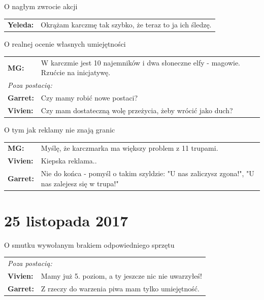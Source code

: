 \documentclass[10pt,twoside,twocolumn]{book}
\begin{document}
\begin{rpg-quotebox}{O nagłym zwrocie akcji}
   \begin{tabularx}{\columnwidth}{lX}
      \textbf{Yeleda:} & Okrążam karczmę tak szybko, że teraz to ja ich śledzę.\\
   \end{tabularx}
\end{rpg-quotebox}

\begin{rpg-quotebox}{O realnej ocenie własnych umiejętności}
   \begin{tabularx}{\columnwidth}{lX}
      \textbf{MG:} & W karczmie jest 10 najemników i dwa słoneczne elfy - magowie. Rzućcie na inicjatywę.\\
      \multicolumn{2}{l}{\textit{Poza postacią:}}\\
      \textbf{Garret:} & Czy mamy robić nowe postaci?\\
      \textbf{Vivien:} & Czy mam dostateczną wolę przeżycia, żeby wrócić jako duch?\\
   \end{tabularx}
\end{rpg-quotebox}

\begin{rpg-quotebox}{O tym jak reklamy nie znają granic}
   \begin{tabularx}{\columnwidth}{lX}
      \textbf{MG:} & Myślę, że karczmarka ma większy problem z 11 trupami.\\
      \textbf{Vivien:} & Kiepska reklama..\\
      \textbf{Garret:} & Nie do końca - pomyśl o takim szyldzie: "U nas zaliczysz zgona!", "U nas zalejesz się w trupa!"\\
   \end{tabularx}
\end{rpg-quotebox}

\section*{25 listopada 2017}

\begin{rpg-quotebox}{O smutku wywołanym brakiem odpowiedniego sprzętu}
   \begin{tabularx}{\columnwidth}{lX}
      \multicolumn{2}{l}{\textit{Poza postacią:}}\\
      \textbf{Vivien:} & Mamy już 5. poziom, a ty jeszcze nic nie uwarzyłeś!\\
      \textbf{Garret:} & Z rzeczy do warzenia piwa mam tylko umiejętność.\\
   \end{tabularx}
\end{rpg-quotebox}
\end{document}
